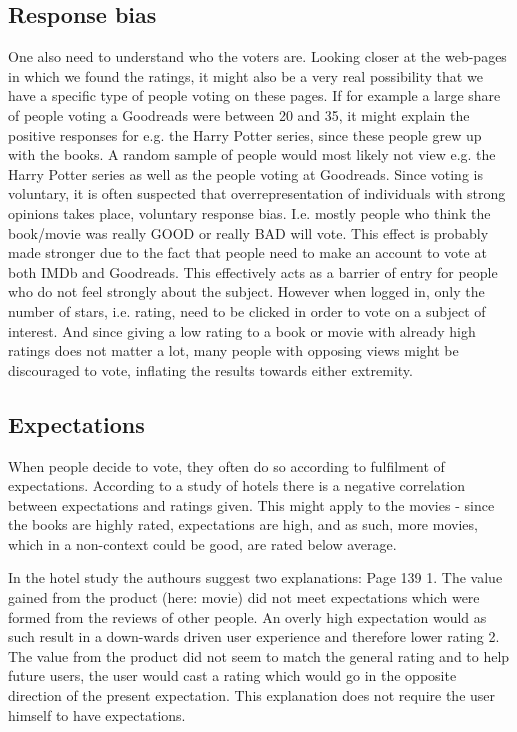 \documentclass[12pt]{article}
\begin{document}
\subsection{Response bias}

One also need to understand who the voters are.  Looking closer at the web-pages in which we found the ratings, it might also be a very real possibility that we have a specific type of people voting on these pages. If for example a large share of people voting a Goodreads were between 20 and 35, it might explain the positive responses for e.g. the Harry Potter series, since these people grew up with the books.
A random sample of people would most likely not view e.g. the Harry Potter series as well as the people voting at Goodreads.
Since voting is voluntary, it is often suspected that overrepresentation of individuals with strong opinions takes place, voluntary response bias. I.e. mostly people who think the book/movie was really GOOD or really BAD will vote. This effect is probably made stronger due to the fact that people need to make an account to vote at both IMDb and Goodreads. This effectively acts as a barrier of entry for people who do not feel strongly about the subject. However when logged in, only the number of stars, i.e. rating, need to be clicked in order to vote on a subject of interest.
 And since giving a low rating to a book or movie with already high ratings does not matter a lot, many people with opposing views might be discouraged to vote, inflating the results towards either extremity.

\subsection{Expectations}

When people decide to vote, they often do so according to fulfilment of expectations. According to a study of hotels there is a negative correlation between expectations and ratings given. This might apply to the movies - since the books are highly rated, expectations are high, and as such, more movies, which in a non-context could be good, are rated below average. 

In the hotel study the authours suggest two explanations: Page 139
1.	The value gained from the product (here: movie) did not meet expectations which were formed from the reviews of other people. An overly high expectation would as such result in a down-wards driven user experience and therefore lower rating
2.	The value from the product did not seem to match the general rating and to help future users, the user would cast a rating which would go in the opposite direction of the present expectation. This explanation does not require the user himself to have expectations.
\end{document}
